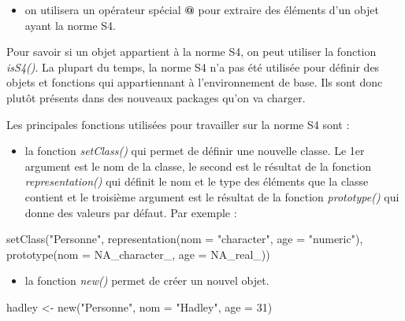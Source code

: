 \documentclass[
]{book}
\newenvironment{Shaded}{\begin{snugshade}}{\end{snugshade}}
\newcommand{\AttributeTok}[1]{\textcolor[rgb]{0.77,0.63,0.00}{#1}}
\newcommand{\ConstantTok}[1]{\textcolor[rgb]{0.00,0.00,0.00}{#1}}
\newcommand{\DecValTok}[1]{\textcolor[rgb]{0.00,0.00,0.81}{#1}}
\newcommand{\FunctionTok}[1]{\textcolor[rgb]{0.00,0.00,0.00}{#1}}
\newcommand{\NormalTok}[1]{#1}
\newcommand{\OtherTok}[1]{\textcolor[rgb]{0.56,0.35,0.01}{#1}}
\newcommand{\StringTok}[1]{\textcolor[rgb]{0.31,0.60,0.02}{#1}}
\providecommand{\tightlist}{%
  \setlength{\itemsep}{0pt}\setlength{\parskip}{0pt}}
\theoremstyle{definition}
\theoremstyle{definition}
\theoremstyle{definition}
\theoremstyle{definition}
\theoremstyle{remark}
\begin{document}
\begin{itemize}
\tightlist
\item
  on utilisera un opérateur spécial \textbf{@} pour extraire des éléments d'un objet ayant la norme S4.
\end{itemize}

Pour savoir si un objet appartient à la norme S4, on peut utiliser la fonction \emph{isS4()}. La plupart du temps, la norme S4 n'a pas été utilisée pour définir des objets et fonctions qui appartiennant à l'environnement de base. Ils sont donc plutôt présents dans des nouveaux packages qu'on va charger.

Les principales fonctions utilisées pour travailler sur la norme S4 sont :

\begin{itemize}
\tightlist
\item
  la fonction \emph{setClass()} qui permet de définir une nouvelle classe. Le 1er argument est le nom de la classe, le second est le résultat de la fonction \emph{representation()} qui définit le nom et le type des éléments que la classe contient et le troisième argument est le résultat de la fonction \emph{prototype()} qui donne des valeurs par défaut. Par exemple :
\end{itemize}

\begin{Shaded}
\begin{Highlighting}[]
\FunctionTok{setClass}\NormalTok{(}\StringTok{"Personne"}\NormalTok{, }\FunctionTok{representation}\NormalTok{(}\AttributeTok{nom =} \StringTok{"character"}\NormalTok{, }\AttributeTok{age =} \StringTok{"numeric"}\NormalTok{),}
                        \FunctionTok{prototype}\NormalTok{(}\AttributeTok{nom =} \ConstantTok{NA\_character\_}\NormalTok{, }\AttributeTok{age =} \ConstantTok{NA\_real\_}\NormalTok{))}
\end{Highlighting}
\end{Shaded}

\begin{itemize}
\tightlist
\item
  la fonction \emph{new()} permet de créer un nouvel objet.
\end{itemize}

\begin{Shaded}
\begin{Highlighting}[]
\NormalTok{hadley }\OtherTok{\textless{}{-}} \FunctionTok{new}\NormalTok{(}\StringTok{"Personne"}\NormalTok{, }\AttributeTok{nom =} \StringTok{"Hadley"}\NormalTok{, }\AttributeTok{age =} \DecValTok{31}\NormalTok{)}
\end{Highlighting}
\end{Shaded}
\end{document}
